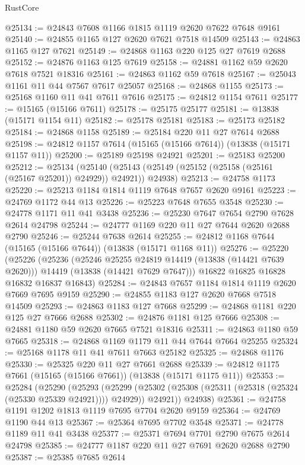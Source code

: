 \begin{lexlean}{RustCore}
\begin{coremodule}
@25134 := @24843 @7608 @1166 @1815 @1119 @2620 @7622 @7648 @9161
@25140 := @24855 @1165 @127 @2620 @7621 @7518 @14509
@25143 := @24863 @1165 @127 @7621
@25149 := @24868 @1163 @220 @125 @27 @7619 @2688
@25152 := @24876 @1163 @125 @7619
@25158 := @24881 @1162 @59 @2620 @7618 @7521 @18316
@25161 := @24863 @1162 @59 @7618
@25167 := @25043 @1161 @11 @44 @7567 @7617 @25057
@25168 := @24868 @1155
@25173 := @25168 @1160 @11 @41 @7611 @7616
@25175 := @24812 @1154 @7611
@25177 := @15165 (@15166 @7611)
@25178 := @25175 @25177
@25181 := @13838 (@15171 @1154 @11)
@25182 := @25178 @25181
@25183 := @25173 @25182
@25184 := @24868 @1158
@25189 := @25184 @220 @11 @27 @7614 @2688
@25198 := @24812 @1157 @7614 (@15165 (@15166 @7614)) (@13838 (@15171 @1157 @11))
@25200 := @25189 @25198 @24921
@25201 := @25183 @25200
@25212 := @25134
    (@25140 (@25143 (@25149 (@25152 (@25158 (@25161 (@25167 @25201)) @24929)) @24921)) @24938)
@25213 := @24758 @1173
@25220 := @25213 @1184 @1814 @1119 @7648 @7657 @2620 @9161
@25223 := @24769 @1172 @44 @13
@25226 := @25223 @7648 @7655 @3548
@25230 := @24778 @1171 @11 @41 @3438
@25236 := @25230 @7647 @7654 @2790 @7628 @2614 @24798
@25244 := @24777 @1169 @220 @11 @27 @7644 @2620 @2688 @2790
@25246 := @25244 @7638 @2614
@25255 := @24812 @1168 @7644 (@15165 (@15166 @7644)) (@13838 (@15171 @1168 @11))
@25276 := @25220
    (@25226
      (@25236
        (@25246 @25255 @24819 @14419 (@13838 (@14421 @7639 @2620)))
        @14419
        (@13838 (@14421 @7629 @7647)))
      @16822
      @16825
      @16828
      @16832
      @16837
      @16843)
@25284 := @24843 @7657 @1184 @1814 @1119 @2620 @7669 @7695 @9159
@25290 := @24855 @1183 @127 @2620 @7668 @7518 @14509
@25293 := @24863 @1183 @127 @7668
@25299 := @24868 @1181 @220 @125 @27 @7666 @2688
@25302 := @24876 @1181 @125 @7666
@25308 := @24881 @1180 @59 @2620 @7665 @7521 @18316
@25311 := @24863 @1180 @59 @7665
@25318 := @24868 @1169 @1179 @11 @44 @7644 @7664 @25255
@25324 := @25168 @1178 @11 @41 @7611 @7663 @25182
@25325 := @24868 @1176
@25330 := @25325 @220 @11 @27 @7661 @2688
@25339 := @24812 @1175 @7661 (@15165 (@15166 @7661)) (@13838 (@15171 @1175 @11))
@25353 := @25284
    (@25290
      (@25293
        (@25299 (@25302 (@25308 (@25311 (@25318 (@25324 (@25330 @25339 @24921)))) @24929)) @24921))
      @24938)
@25361 := @24758 @1191 @1202 @1813 @1119 @7695 @7704 @2620 @9159
@25364 := @24769 @1190 @44 @13
@25367 := @25364 @7695 @7702 @3548
@25371 := @24778 @1189 @11 @41 @3438
@25377 := @25371 @7694 @7701 @2790 @7675 @2614 @24798
@25385 := @24777 @1187 @220 @11 @27 @7691 @2620 @2688 @2790
@25387 := @25385 @7685 @2614

\end{coremodule}
\end{lexlean}
